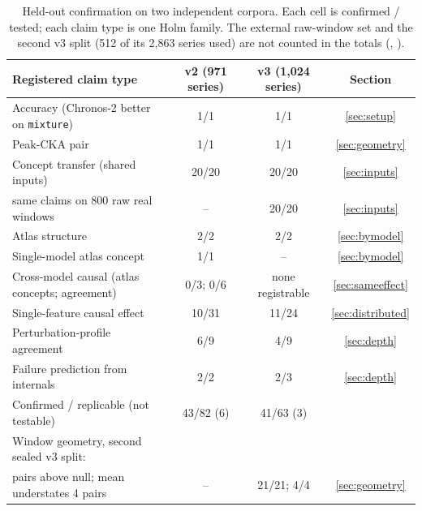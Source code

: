 \begin{table}[!tb]
\centering
\footnotesize
\begin{tabular}{@{}lccc@{}}
\toprule
Registered claim type & v2 (971 series) & v3 (1{,}024 series) & Section \\
\midrule
Accuracy (Chronos-2 better on \texttt{mixture}) & 1/1 & 1/1 & \ref{sec:setup} \\
Peak-CKA pair & 1/1 & 1/1 & \ref{sec:geometry} \\
Concept transfer (shared inputs) & 20/20 & 20/20 & \ref{sec:inputs} \\
\quad same claims on 800 raw real windows & -- & 20/20 & \ref{sec:inputs} \\
Atlas structure & 2/2 & 2/2 & \ref{sec:bymodel} \\
Single-model atlas concept & 1/1 & -- & \ref{sec:bymodel} \\
Cross-model causal (atlas concepts; agreement) & 0/3; 0/6 & none registrable & \ref{sec:sameeffect} \\
Single-feature causal effect & 10/31 & 11/24 & \ref{sec:distributed} \\
Perturbation-profile agreement & 6/9 & 4/9 & \ref{sec:depth} \\
Failure prediction from internals & 2/2 & 2/3 & \ref{sec:depth} \\
\midrule
Confirmed / replicable (not testable) & 43/82 (6) & 41/63 (3) & \\
\midrule
Window geometry, second sealed v3 split: & & & \\
\quad 21 pairs above null; mean understates 4 pairs & -- & 21/21; 4/4 & \ref{sec:geometry} \\
\bottomrule
\end{tabular}
\caption{Held-out confirmation on two independent corpora. Each cell is confirmed / tested; each claim type is one Holm
family. The external raw-window set and the second v3 split (512 of its 2{,}863 series used) are not counted in the
totals (, ).}
\label{tab:heldout}
\end{table}
